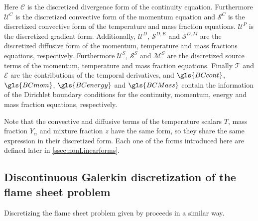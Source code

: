 Here $\mathcal{C}$ is the discretized divergence form of the continuity equation. Furthermore $\mathcal{U}^C$ is the discretized convective form of the momentum equation and  $\mathcal{S}^C$ is the discretized convective form of the temperature and mass fraction equations. $\mathcal{U}^P$ is the discretized gradient form. Additionally, $\mathcal{U}^D$, $\mathcal{S}^{D,E}$ and $\mathcal{S}^{D,M}$ are the discretized diffusive form of the momentum, temperature and mass fractions equations, respectively. Furthermore $\mathcal{U}^S$, $\mathcal{S}^S$ and $\mathcal{M}^S$ are the discretized source terms of the momentum, temperature and mass fraction equations.  Finally $\mathcal{T}$ and $\mathcal{E}$ are the contributions of the temporal derivatives, and $\gls{BCcont}$, $\gls{BCmom}$, $\gls{BCenergy}$ and $\gls{BCMass}$ contain the information of the Dirichlet boundary conditions for the continuity, momentum, energy and mass fraction equations, respectively.

Note that the convective and diffusive terms of the temperature scalars $T$, mass fraction $Y_\alpha$ and mixture fraction $z$ have the same form, so they share the same expression in their discretized form. Each one of the forms introduced here are defined later in \cref{ssec:nonLinearforms}.
\subsection{Discontinuous Galerkin discretization of the flame sheet problem}
Discretizing the flame sheet problem given by  proceeds in a similar way. 

